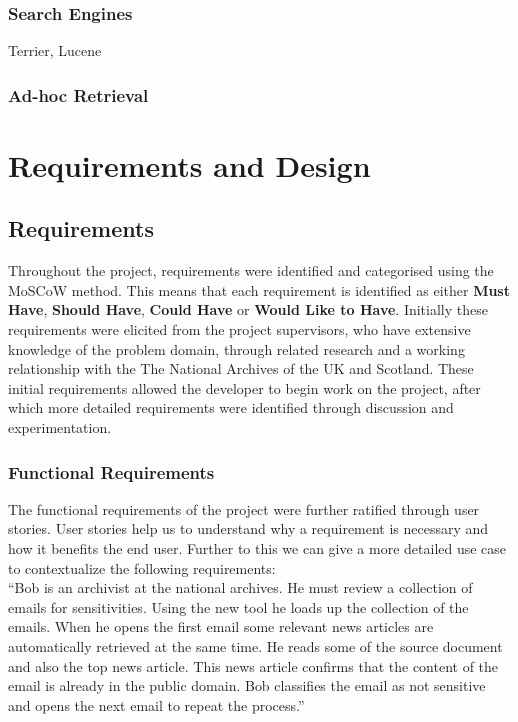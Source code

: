 \documentclass{l4proj}
\begin{document}
\subsection{Search Engines}
Terrier, Lucene
\subsection{Ad-hoc Retrieval}

\chapter{Requirements and Design} \label{requirementsanddesign}
\section{Requirements}
Throughout the project, requirements were identified and categorised using the MoSCoW method. This means that each requirement is identified as either \textbf{Must Have}, \textbf{Should Have}, \textbf{Could Have} or \textbf{Would Like to Have}.
Initially these requirements were elicited from the project supervisors, who have extensive knowledge of the problem domain, through related research and a working relationship with the The National Archives of the UK and Scotland.
These initial requirements allowed the developer to begin work on the project, after which more detailed requirements were identified through discussion and experimentation.

\subsection{Functional Requirements}
The functional requirements of the project were further ratified through user stories. User stories help us to understand why a requirement is necessary and how it benefits the end user. Further to this we can give a more detailed use case to contextualize the following requirements:\\ ``Bob is an archivist at the national archives. He must review a collection of emails for sensitivities. Using the new tool he loads up the collection of the emails. When he opens the first email some relevant news articles are automatically retrieved at the same time. He reads some of the source document and also the top news article. This news article confirms that the content of the email is already in the public domain. Bob classifies the email as not sensitive and opens the next email to repeat the process.''
\end{document}
